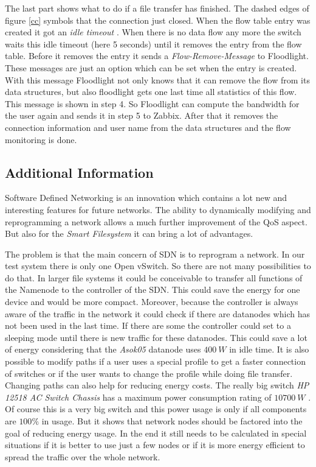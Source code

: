 The last part shows what to do if a file transfer has finished. The dashed edges of figure \ref{cc} symbols that the connection just closed. When the flow table entry was created it got an \textit{idle timeout} \cite[p. 11]{ofspec}. When there is no data flow any more the switch waits this idle timeout (here 5 seconds) until it removes the entry from the flow table. Before it removes the entry it sends a \textit{Flow-Remove-Message} \cite[p. 37]{ofspec} to Floodlight. These messages are just an option which can be set when the entry is created. With this message Floodlight not only knows that it can remove the flow from its data structures, but also floodlight gets one last time all statistics of this flow. This message is shown in step 4. So Floodlight can compute the bandwidth for the user again and sends it in step 5 to Zabbix. After that it removes the connection information and user name from the data structures and the flow monitoring is done.

\subsection{Additional Information}

Software Defined Networking is an innovation which contains a lot new and interesting features for future networks. The ability to dynamically modifying and reprogramming a network allows a much further improvement of the QoS aspect. But also for the \textit{Smart Filesystem} it can bring a lot of advantages.

The problem is that the main concern of SDN is to reprogram a network. In our test system there is only one Open vSwitch. So there are not many possibilities to do that. In larger file systems it could be conceivable to transfer all functions of the Namenode to the controller of the SDN. This could save the energy for one device and would be more compact. Moreover, because the controller is always aware of the traffic in the network it could check if there are datanodes which has not been used in the last time. If there are some the controller could set to a sleeping mode until there is new traffic for these datanodes. This could save a lot of energy considering that the \textit{Asok05} datanode uses $400\ W$ in idle time. It is also possible to modify paths if a user uses a special profile to get a faster connection of switches or if the user wants to change the profile while doing file transfer. Changing paths can also help for reducing energy costs. The really big switch \textit{HP 12518 AC Switch Chassis} has a maximum power consumption rating of $10700\ W$ \cite{hp}. Of course this is a very big switch and this power usage is only if all components are $100\%$ in usage. But it shows that network nodes should be factored into the goal of reducing energy usage. In the end it still needs to be calculated in special situations if it is better to use just a few nodes or if it is more energy efficient to spread the traffic over the whole network. 

